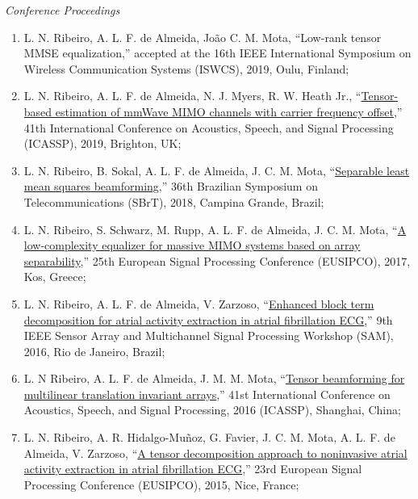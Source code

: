 {\sl Conference Proceedings}

\begin{enumerate}
	\item L. N. Ribeiro, A. L. F. de Almeida, Jo\~ao C. M. Mota, ``Low-rank tensor MMSE equalization,'' accepted at the 16th IEEE International Symposium on Wireless Communication Systems (ISWCS), 2019, Oulu, Finland;
			
	\item L. N. Ribeiro, A. L. F. de Almeida, N. J. Myers, R. W. Heath Jr., ``\href{https://doi.org/10.1109/ICASSP.2019.8683496}{Tensor-based estimation of mmWave MIMO channels with carrier frequency offset},'' 41th International Conference on Acoustics, Speech, and Signal Processing (ICASSP), 2019, Brighton, UK;
	
	\item L. N. Ribeiro, B. Sokal, A. L. F. de Almeida, J. C. M. Mota, ``\href{https://github.com/lnribeiro/lnribeiro.github.io/blob/master/assets/pdf/sbrt18.pdf}{Separable least mean squares beamforming},'' 36th Brazilian Symposium on Telecommunications (SBrT), 2018, Campina Grande, Brazil;
	
	\item L. N. Ribeiro, S. Schwarz, M. Rupp, A. L. F. de Almeida, J. C. M. Mota, ``\href{https://doi.org/10.23919/EUSIPCO.2017.8081651}{A low-complexity equalizer for massive MIMO systems based on array separability},'' 25th European Signal Processing Conference (EUSIPCO), 2017, Kos, Greece;
	
	\item L. N. Ribeiro, A. L. F. de Almeida, V. Zarzoso, ``\href{https://doi.org/10.1109/SAM.2016.7569709}{Enhanced block term decomposition for atrial activity extraction in atrial fibrillation ECG},'' 9th IEEE Sensor Array and Multichannel Signal Processing Workshop (SAM), 2016, Rio de Janeiro, Brazil;
	
	\item L. N Ribeiro,  A. L. F. de Almeida, J. M. M. Mota, ``\href{https://doi.org/10.1109/ICASSP.2016.7472221}{Tensor beamforming for multilinear translation invariant arrays},'' 41st International Conference on Acoustics, Speech, and Signal Processing, 2016 (ICASSP), Shanghai, China;
	
	\item  L. N. Ribeiro, A. R. Hidalgo-Mu\~{n}oz, G. Favier, J. C. M. Mota, A. L. F. de Almeida,  V. Zarzoso, ``\href{https://doi.org/10.1109/EUSIPCO.2015.7362850}{A tensor decomposition approach to noninvasive atrial activity extraction in atrial fibrillation ECG},'' 23rd European Signal Processing Conference (EUSIPCO), 2015, Nice, France;
	

\end{enumerate}
